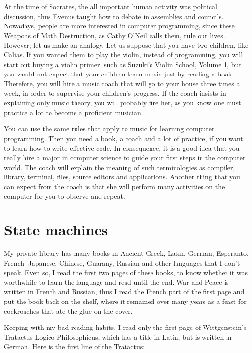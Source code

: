 \documentclass[
  12pt,
]{book}
\begin{document}
At the time of Socrates, the all important human activity was political
discussion, thus Evenus taught how to debate in assemblies and councils.
Nowadays, people are more interested in computer programming, since
these Weapons of Math Destruction, as Cathy O'Neil calls them, rule our
lives. However, let us make an analogy. Let us suppose that you have two
children, like Calias. If you wanted them to play the violin, instead of
programming, you will start out buying a violin primer, such as Suzuki's
Violin School, Volume 1, but you would not expect that your children
learn music just by reading a book. Therefore, you will hire a music
coach that will go to your house three times a week, in order to
supervise your children's progress. If the coach insists in explaining
only music theory, you will probably fire her, as you know one must
practice a lot to become a proficient musician.

You can use the same rules that apply to music for learning computer
programming. Then you need a book, a coach and a lot of practice, if you
want to learn how to write effective code. In consequence, it is a good
idea that you really hire a major in computer science to guide your
first steps in the computer world. The coach will explain the meaning of
such terminologies as compiler, library, terminal, files, source editors
and applications. Another thing that you can expect from the coach is
that she will perform many activities on the computer for you to observe
and repeat.

\chapter{State machines}\label{state-machines}

My private library has many books in Ancient Greek, Latin, German,
Esperanto, French, Japanese, Chinese, Guarany, Russian and other
languages that I don't speak. Even so, I read the first two pages of
these books, to know whether it was worthwhile to learn the language and
read until the end. War and Peace is written in French and Russian, thus
I read the French part of the first page and put the book back on the
shelf, where it remained over many years as a feast for cockroaches that
ate the glue on the cover.

Keeping with my bad reading habits, I read only the first page of
Wittgenstein's Tratactus Logico-Philosophicus, which has a title in
Latin, but is written in German. Here is the first line of the
Tratactus:
\end{document}
